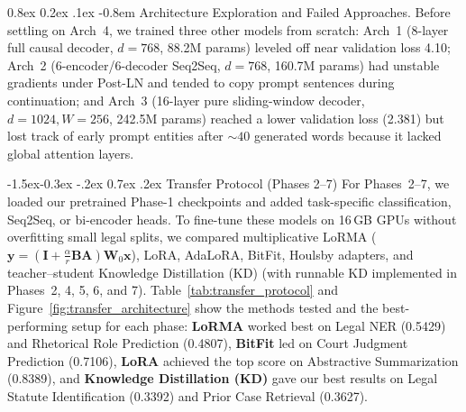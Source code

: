 \documentclass[11pt, oneside]{article}
\makeatletter
\renewcommand\subsection{\@startsection{subsection}{2}{\z@}%
  {-1.5ex\@plus -0.3ex \@minus -.2ex}%
  {0.7ex \@plus .2ex}%
  {\normalfont\large\bfseries}}
\renewcommand\paragraph{\@startsection{paragraph}{4}{\z@}%
  {0.8ex \@plus0.2ex \@minus.1ex}%
  {-0.8em}%
  {\normalfont\normalsize\bfseries}}
\makeatother
\begin{document}
\paragraph{Architecture Exploration and Failed Approaches.}
Before settling on Arch~4, we trained three other models from scratch: Arch~1 (8-layer full causal decoder, $d=768$, 88.2M params) leveled off near validation loss 4.10; Arch~2 (6-encoder/6-decoder Seq2Seq, $d=768$, 160.7M params) had unstable gradients under Post-LN and tended to copy prompt sentences during continuation; and Arch~3 (16-layer pure sliding-window decoder, $d=1024, W=256$, 242.5M params) reached a lower validation loss (2.381) but lost track of early prompt entities after $\sim 40$ generated words because it lacked global attention layers.

\subsection{Transfer Protocol (Phases 2--7)}
For Phases~2--7, we loaded our pretrained Phase-1 checkpoints and added task-specific classification, Seq2Seq, or bi-encoder heads. To fine-tune these models on 16\,GB GPUs without overfitting small legal splits, we compared multiplicative LoRMA ($\mathbf{y} = (\mathbf{I} + \frac{\alpha}{r}\mathbf{B}\mathbf{A})\mathbf{W}_0\mathbf{x}$), LoRA, AdaLoRA, BitFit, Houlsby adapters, and teacher--student Knowledge Distillation (KD) (with runnable KD implemented in Phases~2, 4, 5, 6, and 7). Table~\ref{tab:transfer_protocol} and Figure~\ref{fig:transfer_architecture} show the methods tested and the best-performing setup for each phase: \textbf{LoRMA} worked best on Legal NER (0.5429) and Rhetorical Role Prediction (0.4807), \textbf{BitFit} led on Court Judgment Prediction (0.7106), \textbf{LoRA} achieved the top score on Abstractive Summarization (0.8389), and \textbf{Knowledge Distillation (KD)} gave our best results on Legal Statute Identification (0.3392) and Prior Case Retrieval (0.3627).
\end{document}
